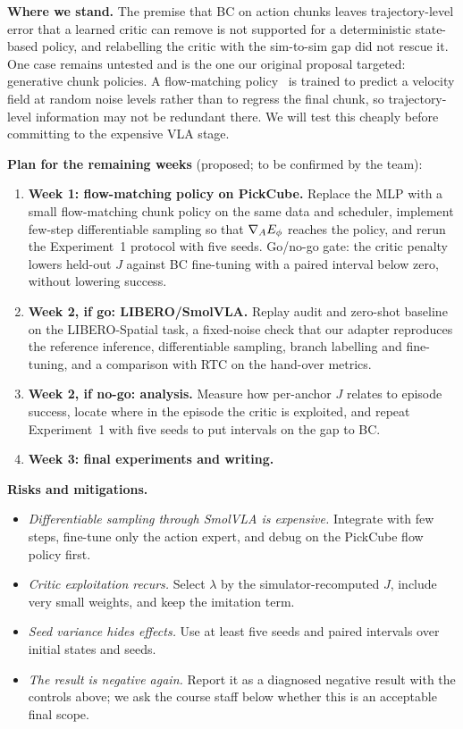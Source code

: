 \textbf{Where we stand.} The premise that BC on action chunks leaves trajectory-level error that a learned critic can remove is not supported for a deterministic state-based policy, and relabelling the critic with the sim-to-sim gap did not rescue it. One case remains untested and is the one our original proposal targeted: generative chunk policies. A flow-matching policy~\cite{lipman2023flow} is trained to predict a velocity field at random noise levels rather than to regress the final chunk, so trajectory-level information may not be redundant there. We will test this cheaply before committing to the expensive VLA stage.

\textbf{Plan for the remaining weeks} (proposed; to be confirmed by the team):
\begin{enumerate}[leftmargin=*, itemsep=2pt]
  \item \textbf{Week 1: flow-matching policy on PickCube.} Replace the MLP with a small flow-matching chunk policy on the same data and scheduler, implement few-step differentiable sampling so that $\nabla_A E_\phi$ reaches the policy, and rerun the Experiment~1 protocol with five seeds. Go/no-go gate: the critic penalty lowers held-out $J$ against BC fine-tuning with a paired interval below zero, without lowering success.
  \item \textbf{Week 2, if go: LIBERO/SmolVLA.} Replay audit and zero-shot baseline on the LIBERO-Spatial task, a fixed-noise check that our adapter reproduces the reference inference, differentiable sampling, branch labelling and fine-tuning, and a comparison with RTC on the hand-over metrics.
  \item \textbf{Week 2, if no-go: analysis.} Measure how per-anchor $J$ relates to episode success, locate where in the episode the critic is exploited, and repeat Experiment~1 with five seeds to put intervals on the gap to BC.
  \item \textbf{Week 3: final experiments and writing.}
\end{enumerate}

\textbf{Risks and mitigations.}
\begin{itemize}[leftmargin=*, itemsep=2pt]
  \item \emph{Differentiable sampling through SmolVLA is expensive.} Integrate with few steps, fine-tune only the action expert, and debug on the PickCube flow policy first.
  \item \emph{Critic exploitation recurs.} Select $\lambda$ by the simulator-recomputed $J$, include very small weights, and keep the imitation term.
  \item \emph{Seed variance hides effects.} Use at least five seeds and paired intervals over initial states and seeds.
  \item \emph{The result is negative again.} Report it as a diagnosed negative result with the controls above; we ask the course staff below whether this is an acceptable final scope.
\end{itemize}

